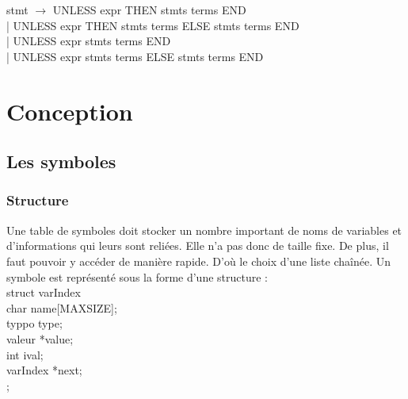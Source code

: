 \documentclass{article}
\begin{document}
\noindent stmt $\rightarrow$ UNLESS expr THEN stmts terms END \\ 
| UNLESS expr THEN stmts terms ELSE stmts terms END \\
| UNLESS expr stmts terms END \\
| UNLESS expr stmts terms ELSE stmts terms END \\ 

\section{Conception}

\subsection{Les symboles} 


\subsubsection*{Structure}
Une table de symboles doit stocker un nombre important de noms de variables et d'informations qui leurs sont reliées. Elle n'a pas donc de taille fixe. De plus, il faut pouvoir y accéder de manière rapide. D'où le choix d'une liste chaînée. 
Un symbole est représenté sous la forme d'une structure :  \\

struct varIndex { \\
char name[MAXSIZE]; \\
typpo type; \\
valeur *value; \\
int ival; \\
varIndex *next; \\
}; \\
\end{document}

